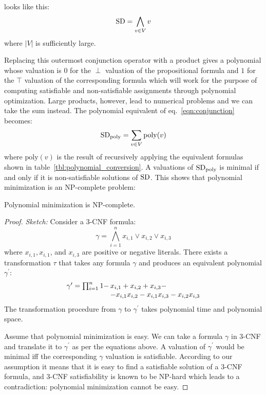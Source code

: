 \documentclass{article}
\begin{document}
\sd looks like this:
%
\begin{eqnarray}
  \label{eqn:conjunction}
  \mathrm{SD} = \bigwedge_{v \in V}{v}
\end{eqnarray}
where $|V|$ is sufficiently large.
\par
Replacing this outermost conjunction operator with a product gives a
polynomial whose valuation is $0$ for the $\perp$ valuation of the
propositional formula and $1$ for the $\top$ valuation of the
corresponding formula which will work for the purpose of computing
satisfiable and non-satisfiable assignments through polynomial
optimization. Large products, however, lead to numerical problems and
we can take the sum instead. The polynomial equivalent of
eq.~\ref{eqn:conjunction} becomes:
%
\begin{eqnarray}
  \label{eqn:conjunction}
  \mathrm{SD}_{\mathrm{poly}} = \sum_{v \in V}{\mathrm{poly}(v)}
\end{eqnarray}
where $\mathrm{poly}(v)$ is the result of recursively applying the
equivalent formulas shown in
table~\ref{tbl:polynomial_conversion}. A valuations of
$\mathrm{SD}_{\mathrm{poly}}$ is minimal if and only if it is non-satisfiable
solutions of $\mathrm{SD}$. This shows that polynomial minimization is an
$\mathrm{NP}$-complete problem:
%
\begin{theorem}
  Polynomial minimization is $\mathrm{NP}$-complete.
\end{theorem}
\begin{proof}\textit{Sketch:}
	Consider a 3-CNF formula:
	\[
	\gamma = \bigwedge_{i = 1}^{n}{x_{i, 1} \vee x_{i, 2} \vee x_{i, 3}}
	\]
	where $x_{i, 1}, x_{i, 1}$, and $x_{i, 3}$ are positive or negative
	literals. There exists a transformation $\tau$ that takes any
	formula $\gamma$ and produces an equivalent polynomial
	$\gamma^\prime$:
	\[
	\begin{array}{l@{\,}l}
	\gamma^\prime = \prod_{i = 1}^{n} 1 - & x_{i, 1} + x_{i, 2} + x_{i, 3} - \\
	& - x_{i, 1}x_{i, 2} - x_{i, 1}x_{i, 3} - x_{i, 2}x_{i, 3}
	\end{array}
	\]
	The transformation procedure from $\gamma$ to $\gamma^\prime$ takes
	polynomial time and polynomial space.
	\par
	Assume that polynomial minimization is easy. We can take a formula
	$\gamma$ in 3-CNF and translate it to $\gamma^\prime$ as per the
	equations above. A valuation of $\gamma^\prime$ would be minimal iff
	the corresponding $\gamma$ valuation is satisfiable. According
	to our assumption it means that it is easy to find a satisfiable
	solution of a 3-CNF formula, and 3-CNF satisfiability is known to be
	NP-hard \cite{woeginger2003exact} which leads to a contradiction: polynomial
	minimization cannot be easy.
\end{proof}
%
\end{document}
